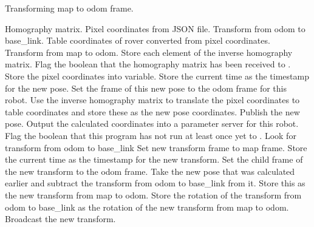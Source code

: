 \documentclass{article}
\begin{document}
          \begin{algorithm}[H]
               \caption[Transform Between Map and Odom Frames]{Transforming map to odom frame.}
               \label{alg:map_odom}
               \begin{algorithmic}[1]
                    \REQUIRE Homography matrix. Pixel coordinates from JSON file. Transform from odom to base\_link.
                    \ENSURE Table coordinates of rover converted from pixel coordinates. Transform from map to odom.
                         \STATE Store each element of the inverse homography matrix.
                         \STATE Flag the boolean that the homography matrix has been received to \TRUE.
                    \ENDFOR
                         \STATE Store the pixel coordinates into variable.
                              \STATE Store the current time as the timestamp for the new pose.
                              \STATE Set the frame of this new pose to the odom frame for this robot.
                              \STATE Use the inverse homography matrix to translate the pixel coordinates to table coordinates and store these as the new pose coordinates.
                              \STATE Publish the new pose.
                                   \STATE Output the calculated coordinates into a parameter server for this robot.
                                   \STATE Flag the boolean that this program has not run at least once yet to \FALSE.
                              \ENDIF
                                   \REPEAT
                                   \STATE Look for transform from odom to base\_link
                                   \STATE Set new transform frame to map frame.
                                   \STATE Store the current time as the timestamp for the new transform.
                                   \STATE Set the child frame of the new transform to the odom frame.
                                   \STATE Take the new pose that was calculated earlier and subtract the transform from odom to base\_link from it. Store this as the new transform from map to odom.
                                   \STATE Store the rotation of the transform from odom to base\_link as the rotation of the new transform from map to odom.
                                   \STATE Broadcast the new transform.
                                   \ENDIF
                              \ENDWHILE
                         \ENDIF
                    \ENDFOR
               \end{algorithmic}
          \end{algorithm}
\end{document}
